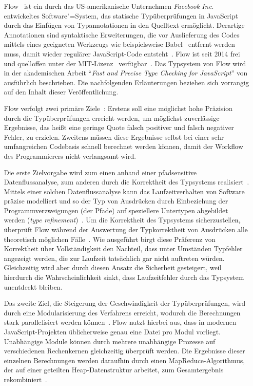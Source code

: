 Flow~\autocite{FLOW:PAPER} ist ein durch das US-amerikanische Unternehmen \textit{Facebook Inc.} entwickeltes Software"=System, das statische Typüberprüfungen in JavaScript durch das Einfügen von Typannotationen in den Quelltext ermöglicht. Derartige Annotationen sind syntaktische Erweiterungen, die vor Auslieferung des Codes mittels eines geeigneten Werkzeugs wie beispielsweise Babel~\autocite{BABEL} entfernt werden muss, damit wieder regulärer JavaScript-Code entsteht~\autocite{FLOW:INSTALLATION}. Flow ist seit 2014 frei und quelloffen unter der MIT-Lizenz~\autocite{LICENSE:MIT} verfügbar~\autocite{FLOW:GITHUB}. Das Typsystem von Flow wird in der akademischen Arbeit \enquote{\textit{Fast and Precise Type Checking for JavaScript}} von \citeauthor{FLOW:PAPER} ausführlich beschrieben. Die nachfolgenden Erläuterungen beziehen sich vorrangig auf den Inhalt dieser Veröffentlichung.

Flow verfolgt zwei primäre Ziele~\autocite{FLOW:TYPE_SYSTEM}: Erstens soll eine möglichst hohe Präzision durch die Typüberprüfungen erreicht werden, um möglichst zuverlässige Ergebnisse, das heißt eine geringe Quote falsch positiver und falsch negativer Fehler, zu erzielen. Zweitens müssen diese Ergebnisse selbst bei einer sehr umfangreichen Codebasis schnell berechnet werden können, damit der Workflow des Programmierers nicht verlangsamt wird.

Die erste Zielvorgabe wird zum einen anhand einer pfadsensitive Datenflussanalyse, zum anderen durch die Korrektheit des Typsystems realisiert~\autocite{FLOW:TYPE_SYSTEM}. Mittels einer solchen Datenflussanalyse kann das Laufzeitverhalten von Software präzise modelliert und so der Typ von Ausdrücken durch Einbeziehung der Programmverzweigungen (der Pfade) auf speziellere Untertypen abgebildet werden (\textit{type refinement})~\cites{WINTER:2013}[2]{FLOW:PAPER}.
Um die Korrektheit des Typsystems sicherzustellen, überprüft Flow während der Auswertung der Typkorrektheit von Ausdrücken alle theoretisch möglichen Fälle~\autocite{FLOW:TYPES_AND_EXPRESSIONS}. Wie ausgeführt birgt diese Präferenz von Korrektheit über Vollständigkeit den Nachteil, dass unter Umständen Typfehler angezeigt werden, die zur Laufzeit tatsächlich gar nicht auftreten würden. Gleichzeitig wird aber durch diesen Ansatz die Sicherheit gesteigert, weil hierdurch die Wahrscheinlichkeit sinkt, dass Laufzeitfehler durch das Typsystem unentdeckt bleiben.

Das zweite Ziel, die Steigerung der Geschwindigkeit der Typüberprüfungen, wird durch eine Modularisierung des Verfahrens erreicht, wodurch die Berechnungen stark parallelisiert werden können~\autocite[4]{FLOW:PAPER}. Flow nutzt hierbei aus, dass in modernen JavaScript-Projekten üblicherweise genau eine Datei pro Modul vorliegt. Unabhängige Module können durch mehrere unabhängige Prozesse auf verschiedenen Rechenkernen gleichzeitig überprüft werden. Die Ergebnisse dieser einzelnen Berechnungen werden daraufhin durch einen MapReduce-Algorithmus, der auf einer geteilten Heap-Datenstruktur arbeitet, zum Gesamtergebnis rekombiniert~\autocite[22\psq]{FLOW:PAPER}.

